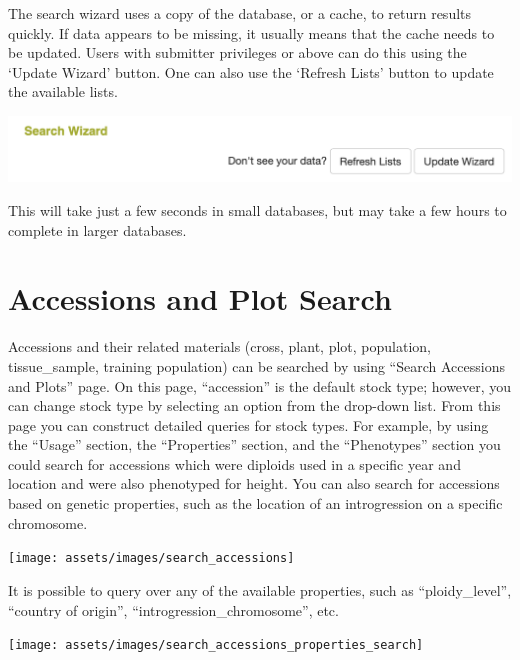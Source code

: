 \documentclass[
  12pt,
]{book}
\begin{document}
The search wizard uses a copy of the database, or a cache, to return results quickly. If data appears to be missing, it usually means that the cache needs to be updated. Users with submitter privileges or above can do this using the `Update Wizard' button. One can also use the `Refresh Lists' button to update the available lists.

\begin{center}\includegraphics[width=0.75\linewidth]{assets/images/wizard_update_list_refresh} \end{center}

This will take just a few seconds in small databases, but may take a few hours to complete in larger databases.

\hypertarget{accessions-and-plot-search}{%
\section{Accessions and Plot Search}\label{accessions-and-plot-search}}

Accessions and their related materials (cross, plant, plot, population, tissue\_sample, training population) can be searched by using ``Search Accessions and Plots'' page. On this page, ``accession'' is the default stock type; however, you can change stock type by selecting an option from the drop-down list. From this page you can construct detailed queries for stock types. For example, by using the ``Usage'' section, the ``Properties'' section, and the ``Phenotypes'' section you could search for accessions which were diploids used in a specific year and location and were also phenotyped for height. You can also search for accessions based on genetic properties, such as the location of an introgression on a specific chromosome.

\begin{center}\texttt{[image: assets/images/search\_accessions]} \end{center}

It is possible to query over any of the available properties, such as ``ploidy\_level'', ``country of origin'', ``introgression\_chromosome'', etc.

\begin{center}\texttt{[image: assets/images/search\_accessions\_properties\_search]} \end{center}
\end{document}
